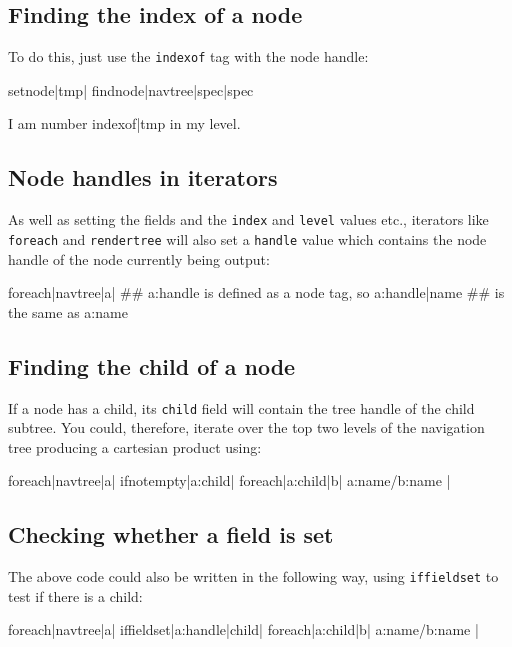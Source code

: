 \subsection{Finding the index of a node}
To do this, just use the \texttt{indexof} tag with the node handle:
\begin{MyVerbatim}
{{setnode|tmp|
    {{findnode|{{navtree}}|spec|{{spec}}}}}}

I am number {{indexof|{{tmp}}}} in my level.
\end{MyVerbatim}

\subsection{Node handles in iterators}
As well as setting the fields and the \texttt{index} and \texttt{level} values etc.,
iterators like \texttt{foreach} and \texttt{rendertree} will also set a \texttt{handle}
value which contains the node handle of the node currently being output:
\begin{MyVerbatim}
{{foreach|{{navtree}}|a|
## a:handle is defined as a node tag, so
    {{a:handle|name}}
## is the same as
    {{a:name}}
}}
\end{MyVerbatim}

\subsection{Finding the child of a node}
If a node has a child, its \texttt{child} field will contain the tree handle
of the child subtree. You could, therefore, iterate over the top two levels
of the navigation tree producing a cartesian product using:
\begin{MyVerbatim}
{{foreach|{{navtree}}|a|
   {{ifnotempty|{{a:child}}|
       {{foreach|{{a:child}}|b|
            {{a:name}}/{{b:name}}}}
   |}}
}}
\end{MyVerbatim}

\subsection{Checking whether a field is set}
The above code could also be written in the following way, using \texttt{iffieldset} to test if there is
a child:
\begin{MyVerbatim}
{{foreach|{{navtree}}|a|
   {{iffieldset|{{a:handle}}|child|
       {{foreach|{{a:child}}|b|
            {{a:name}}/{{b:name}}}}
   |}}
}}
\end{MyVerbatim}


